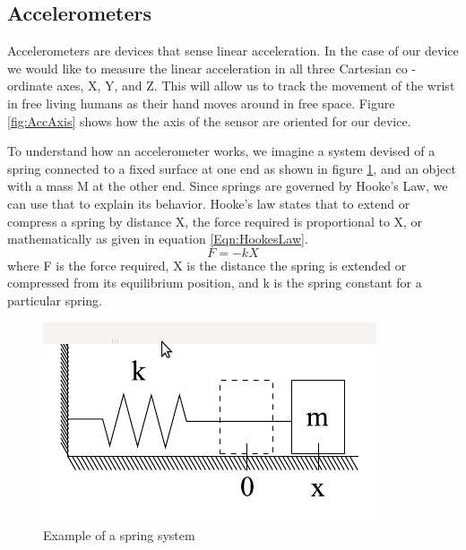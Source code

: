 \subsection{Accelerometers}
\label{Sec:Accelerometer}
Accelerometers are devices that sense linear acceleration. In the case of our device we would like to measure the linear acceleration in all three Cartesian co - ordinate axes, X, Y, and Z. This will allow us to track the movement of the wrist in free living humans as their hand moves around in free space. Figure \ref{fig:AccAxis} shows how the axis of the sensor are oriented for our device.

To understand how an accelerometer works, we imagine a system devised of a spring connected to a fixed surface at one end as shown in figure \ref{fig:HookeSpring}, and an object with a mass M at the other end. Since springs are governed by Hooke's Law, we can use that to explain its behavior. Hooke's law states that to extend or compress a spring by distance X, the force required is proportional to X, or mathematically as given in equation \ref{Eqn:HookesLaw}.
\begin{equation}
\label{Eqn:HookesLaw}
F = -kX 
\end{equation}
where F is the force required, X is the distance the spring is extended or compressed from its equilibrium position, and k is the spring constant for a particular spring.
\begin{figure}
\begin{center}
\includegraphics{images/HookesLaw.png}
\caption{Example of a spring system}
\label{fig:HookeSpring}
\end{center}
\end{figure}

